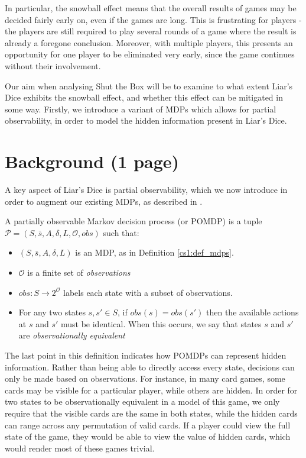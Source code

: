 In particular, the snowball effect means that the overall results of games may be decided fairly early on, even if the games are long. This is frustrating for players - the players are still required to play several rounds of a game where the result is already a foregone conclusion. Moreover, with multiple players, this presents an opportunity for one player to be eliminated very early, since the game continues without their involvement.

Our aim when analysing Shut the Box will be to examine to what extent Liar's Dice exhibits the snowball effect, and whether this effect can be mitigated in some way. Firstly, we introduce a variant of MDPs which allows for partial observability, in order to model the hidden information present in Liar's Dice.

\section{Background (1 page)}

A key aspect of Liar's Dice is partial observability, which we now introduce in order to augment our existing MDPs, as described in \cite{norman_verification_2017}.

\begin{definition}
    \label{cs2:def-pomdps}

    A partially observable Markov decision process (or POMDP) is a tuple $\mathcal{P} = (S, \bar{s}, A, \delta, L, \mathcal{O}, obs)$ such that:

    \begin{itemize}
        \item $(S, \bar{s}, A, \delta, L)$ is an MDP, as in Definition \ref{cs1:def_mdps}.
        \item $\mathcal{O}$ is a finite set of \emph{observations}
        \item $obs : S \rightarrow 2^{\mathcal{O}}$ labels each state with a subset of observations.
        \item For any two states $s, s' \in S$, if $obs(s) = obs(s')$ then the available actions at $s$ and $s'$ must be identical. When this occurs, we say that states $s$ and $s'$ are \emph{observationally equivalent}
    \end{itemize}
\end{definition}

The last point in this definition indicates how POMDPs can represent hidden information. Rather than being able to directly access every state, decisions can only be made based on observations. For instance, in many card games, some cards may be visible for a particular player, while others are hidden. In order for two states to be observationally equivalent in a model of this game, we only require that the visible cards are the same in both states, while the hidden cards can range across any permutation of valid cards. If a player could view the full state of the game, they would be able to view the value of hidden cards, which would render most of these games trivial.

